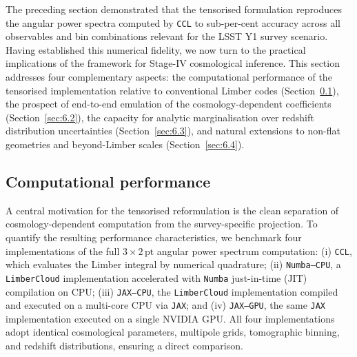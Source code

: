 The preceding section demonstrated that the tensorised formulation reproduces the angular power spectra computed by \texttt{CCL} to sub-per-cent accuracy across all observables and bin combinations relevant for the LSST Y1 survey scenario. Having established this numerical fidelity, we now turn to the practical implications of the framework for Stage-IV cosmological inference. This section addresses four complementary aspects: the computational performance of the tensorised implementation relative to conventional Limber codes (Section~\ref{sec:6.1}), the prospect of end-to-end emulation of the cosmology-dependent coefficients (Section~\ref{sec:6.2}), the capacity for analytic marginalisation over redshift distribution uncertainties (Section~\ref{sec:6.3}), and natural extensions to non-flat geometries and beyond-Limber scales (Section~\ref{sec:6.4}).

\subsection{Computational performance} \label{sec:6.1}

A central motivation for the tensorised reformulation is the clean separation of cosmology-dependent computation from the survey-specific projection. To quantify the resulting performance characteristics, we benchmark four implementations of the full \(3\times2\,\mathrm{pt}\) angular power spectrum computation: (i) \texttt{CCL}, which evaluates the Limber integral by numerical quadrature; (ii) \texttt{Numba--CPU}, a \texttt{LimberCloud} implementation accelerated with \texttt{Numba} just-in-time (JIT) compilation on CPU; (iii) \texttt{JAX--CPU}, the \texttt{LimberCloud} implementation compiled and executed on a multi-core CPU via \texttt{JAX}; and (iv) \texttt{JAX--GPU}, the same \texttt{JAX} implementation executed on a single NVIDIA GPU. All four implementations adopt identical cosmological parameters, multipole grids, tomographic binning, and redshift distributions, ensuring a direct comparison.

